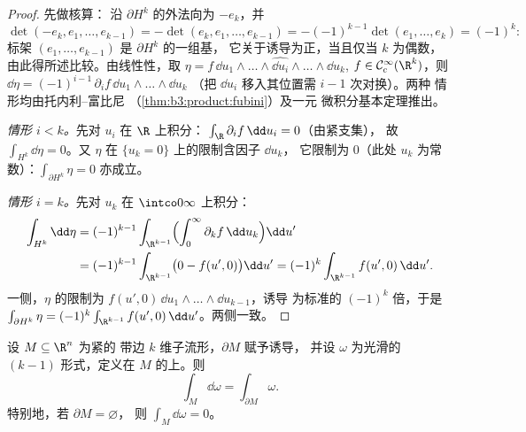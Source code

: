 \begin{proof}
先做核算：
沿 $\partial H^k$ 的外法向为 $-e_k$，并
\[
\det(-e_k, e_1, \dots, e_{k-1}) =
-\det(e_k, e_1, \dots, e_{k-1}) = -(-1)^{k-1}\det(e_1,
\dots, e_k) = (-1)^k :
\]
标架 $(e_1, \dots, e_{k-1})$ 是 $\partial H^k$ 的一组基，
它关于诱导为正，当且仅当 $k$
为偶数，由此得所述比较。由线性性，取 $\eta
= f\,\dd u_1\wedge\dots\wedge\widehat{\dd
u_i}\wedge\dots\wedge\dd u_k$, $f \in \mathcal
C^\infty_c(\R^k)$，则 $\dd\eta =
(-1)^{i-1}\,\partial_if\,\dd u_1\wedge\dots\wedge\dd u_k$
（把 $\dd u_i$ 移入其位置需 $i - 1$ 次对换）。两种
情形均由托内利--富比尼
（\cref{thm:b3:product:fubini}）及一元
微积分基本定理推出。

\emph{情形 $i < k$。}先对 $u_i$ 在 $\R$ 上积分：
$\int_\R\partial_if\,\dd u_i = 0$（由紧支集），
故 $\int_{H^k}\dd\eta = 0$。又 $\eta$ 在
$\{u_k = 0\}$ 上的限制含因子 $\dd u_k$，
它限制为 $0$（此处 $u_k$ 为常数）：$\int_{\partial H^k}\eta =
0$ 亦成立。

\emph{情形 $i = k$。}先对 $u_k$
在 $\intco0\infty$ 上积分：
\begin{align*}
\int_{H^k}\dd\eta &= (-1)^{k-1}\int_{\R^{k-1}}
\Bigl(\int_0^\infty\partial_kf\,\dd u_k\Bigr)\dd u' \\
&= (-1)^{k-1}\int_{\R^{k-1}}\bigl(0 - f(u', 0)\bigr)\dd u'
= (-1)^k\int_{\R^{k-1}}f(u',0)\,\dd u' .
\end{align*}
一侧，$\eta$ 的限制为 $f(u',
0)\,\dd u_1\wedge\dots\wedge\dd u_{k-1}$，诱导
为标准的 $(-1)^k$ 倍，于是
$\int_{\partial H^k}\eta =
(-1)^k\int_{\R^{k-1}}f(u',0)\,\dd u'$。两侧一致。
\end{proof}

\begin{theorem}[斯托克斯]\label{thm:b3:forms:stokes}
设 $M \subseteq \R^n$ 为紧的
带边 $k$ 维子流形，$\partial M$ 赋予诱导，
并设 $\omega$ 为光滑的 $(k-1)$ 形式，定义在
$M$ 的上。则
\[
\int_M\dd\omega = \int_{\partial M}\omega .
\]
特别地，若 $\partial M = \varnothing$，
则 $\int_M\dd\omega = 0$。
\end{theorem}

